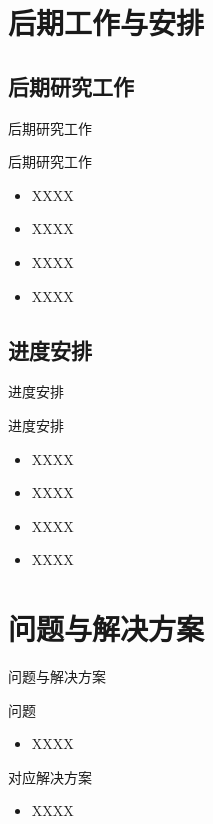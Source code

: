 \documentclass{beamer}
\begin{document}
\section{后期工作与安排}

\subsection{后期研究工作}

\begin{frame}{后期研究工作}
  \begin{block}{后期研究工作}
    \begin{itemize}
      \setlength{\itemsep}{6pt}
      \item XXXX
      \item XXXX
      \item XXXX
      \item XXXX
    \end{itemize}
  \end{block}
\end{frame}

\subsection{进度安排}

\begin{frame}{进度安排}
  \begin{block}{进度安排}
    \begin{itemize}
      \setlength{\itemsep}{6pt}
      \item XXXX\cite{liu2016}
      \item XXXX\cite{ren2010}
      \item XXXX\cite{Chen1992}
      \item XXXX\cite{Gravagne2003}
    \end{itemize}
  \end{block}
\end{frame}

\section{问题与解决方案}

\begin{frame}{问题与解决方案}
  \begin{block}{问题}
    \begin{itemize}
      \item XXXX
    \end{itemize}
  \end{block}
  \begin{block}{对应解决方案}
    \begin{itemize}
      \item XXXX
    \end{itemize}
  \end{block}
\end{frame}
\end{document}
